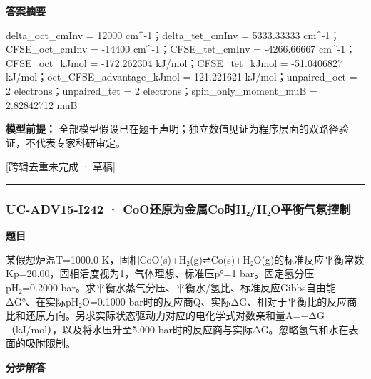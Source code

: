 \documentclass[UTF8,11pt,a4paper]{ctexart}
\begin{document}
\noindent\textbf{答案摘要}\par
delta\_oct\_cmInv = 12000 cm\textasciicircum{}-1；delta\_tet\_cmInv = 5333.33333 cm\textasciicircum{}-1；CFSE\_oct\_cmInv = -14400 cm\textasciicircum{}-1；CFSE\_tet\_cmInv = -4266.66667 cm\textasciicircum{}-1；CFSE\_oct\_kJmol = -172.262304 kJ/mol；CFSE\_tet\_kJmol = -51.0406827 kJ/mol；oct\_CFSE\_advantage\_kJmol = 121.221621 kJ/mol；unpaired\_oct = 2 electrons；unpaired\_tet = 2 electrons；spin\_only\_moment\_muB = 2.82842712 muB\par
\noindent\textbf{模型前提：}
全部模型假设已在题干声明；独立数值见证为程序层面的双路径验证，不代表专家科研审定。\par
\noindent\textcolor{red!65!black}{[跨辑去重未完成 · 草稿]} \par
\medskip\hrule\medskip
{}
\subsubsection*{UC-ADV15-I242 · CoO还原为金属Co时H₂/H₂O平衡气氛控制}
\noindent\textbf{题目}\par
某假想炉温T=1000.0 K，固相CoO(s)+H₂(g)⇌Co(s)+H₂O(g)的标准反应平衡常数Kp=20.00，固相活度视为1，气体理想、标准压p°=1 bar。固定氢分压pH₂=0.2000 bar。求平衡水蒸气分压、平衡水/氢比、标准反应Gibbs自由能ΔG°、在实际pH₂O=0.1000 bar时的反应商Q、实际ΔG、相对于平衡比的反应商比和还原方向。另求实际状态驱动力对应的电化学式对数亲和量A=−ΔG（kJ/mol），以及将水压升至5.000 bar时的反应商与实际ΔG。忽略氢气和水在表面的吸附限制。\par
\medskip\noindent\textbf{分步解答}
\end{document}
